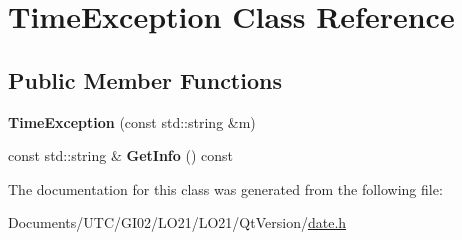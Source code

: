 \hypertarget{class_time_exception}{}\section{Time\+Exception Class Reference}
\label{class_time_exception}
\subsection*{Public Member Functions}
\begin{DoxyCompactItemize}
\item 
\mbox{\label{class_time_exception_a22a2308236c1b525d7910ac582c3a0c4}} 
{\bfseries Time\+Exception} (const std\+::string \&m)
\item 
\mbox{\label{class_time_exception_a4475d44829f2674ec87e2230e2424572}} 
const std\+::string \& {\bfseries Get\+Info} () const
\end{DoxyCompactItemize}


The documentation for this class was generated from the following file\+:\begin{DoxyCompactItemize}
\item 
Documents/\+U\+T\+C/\+G\+I02/\+L\+O21/\+L\+O21/\+Qt\+Version/\hyperlink{date_8h}{date.\+h}\end{DoxyCompactItemize}
